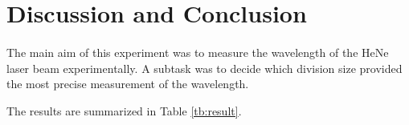 \documentclass{article}
\begin{document}
\section{Discussion and Conclusion}
\paragraph{}
The main aim of this experiment was to measure the wavelength of the HeNe laser beam experimentally. A subtask was to decide which division size provided the most precise measurement of the wavelength.

The results are summarized in Table \ref{tb:result}.



\printbibliography
\end{document}

